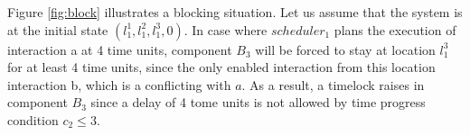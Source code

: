 \begin{example}
Figure \ref{fig:block} illustrates a blocking situation.
Let us assume that the system is at the initial state $(l_1^1, l_1^2, l_1^3, 0)$.
In case where $scheduler_1$ plans the execution of interaction a at 4 time units,
component $B_3$ will be forced to stay at location $l^3_1$ for at least 4 time units, since
the only enabled interaction from this location interaction b, which is a conflicting with $a$.
As a result, a timelock raises in component $B_3$ since a delay of 4 tome units is not
allowed by time progress condition $c_2 \le 3$. 
\end{example}

